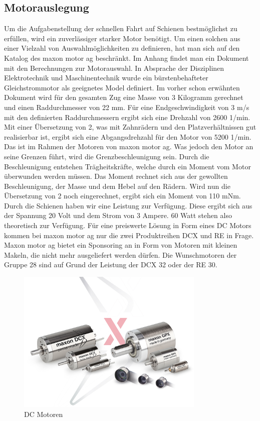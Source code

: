 \documentclass[../../main.tex]{subfiles}
\begin{document}
    \subsection{Motorauslegung}
          Um die Aufgabenstellung der schnellen Fahrt auf Schienen bestmöglichst zu erfüllen, wird ein zuverlässiger starker Motor benötigt. Um einen solchen aus einer Vielzahl von Auswahlmöglichkeiten zu definieren, hat man sich auf den Katalog des maxon motor ag beschränkt. Im Anhang findet man ein Dokument mit den Berechnungen zur Motorauswahl. In Absprache der Disziplinen Elektrotechnik und Maschinentechnik wurde ein bürstenbehafteter Gleichstrommotor als geeignetes Model definiert. Im vorher schon erwähnten Dokument wird für den gesamten Zug eine Masse von 3 Kilogramm gerechnet und einen Raddurchmesser von 22 mm. Für eine Endgeschwindigkeit von 3 m/s mit den definierten Raddurchmessern ergibt sich eine Drehzahl von 2600 1/min. Mit einer Übersetzung von 2, was mit Zahnrädern und den Platzverhältnissen gut realisierbar ist, ergibt sich eine Abgangsdrehzahl für den Motor von 5200 1/min. Das ist im Rahmen der Motoren von maxon motor ag. Was jedoch den Motor an seine Grenzen führt, wird die Grenzbeschleunigung sein. Durch die Beschleunigung entstehen Trägheitskräfte, welche durch ein Moment vom Motor überwunden werden müssen. Das Moment rechnet sich aus der gewollten Beschleunigung, der Masse und dem Hebel auf den Rädern. Wird nun die Übersetzung von 2 noch eingerechnet, ergibt sich ein Moment von 110 mNm. Durch die Schienen haben wir eine Leistung zur Verfügung. Diese ergibt sich aus der Spannung 20 Volt und dem Strom von 3 Ampere. 60 Watt stehen also theoretisch zur Verfügung. Für eine preiswerte Lösung in Form eines DC Motors kommen bei maxon motor ag nur die zwei Produktreihen DCX und RE in Frage. Maxon motor ag bietet ein Sponsoring an in Form von Motoren mit kleinen Makeln, die nicht mehr ausgeliefert werden dürfen. Die Wunschmotoren der Gruppe 28 sind auf Grund der Leistung der DCX 32 oder der RE 30.

    \begin{figure}[H]
        \centering
        \includegraphics[width=0.8\textwidth]{../../images/Kran/Motors.JPG}
        \caption {DC Motoren}
    \end{figure}


    
\end{document}

